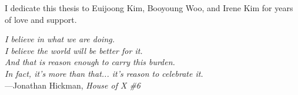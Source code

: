 %
\begin{frontmatter}

%
%
\makefrontmatter

%
%
%
%
%
%
\begin{dedication}
  I dedicate this thesis to Euijoong Kim, Booyoung Woo, and Irene Kim for years of love and support.
\end{dedication}


%
%



%
%
\begin{epigraph} %
  \emph{I believe in what we are doing.\\
  I believe the world will be better for it.\\
  And that is reason enough to carry this burden.\\
  In fact, it's more than that... it's reason to celebrate it.}\\
  ---Jonathan Hickman, \textit{House of X \#6}
\end{epigraph}

%



\end{frontmatter}
